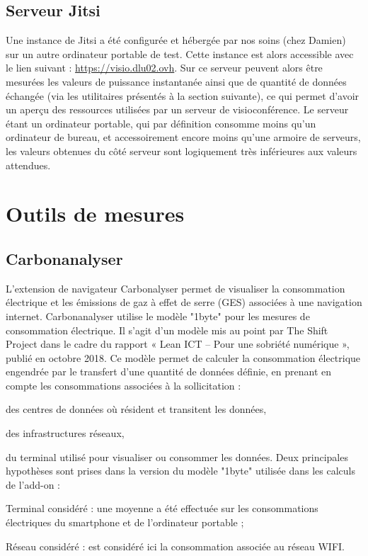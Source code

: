 \documentclass[11pt,a4paper]{report}
\begin{document}
\subsection{Serveur Jitsi}
Une instance de Jitsi a été configurée et hébergée par nos soins (chez Damien) sur un autre ordinateur portable de test. Cette instance est alors accessible avec le lien suivant : \url{https://visio.dlu02.ovh}. Sur ce serveur peuvent alors être mesurées les valeurs de puissance instantanée ainsi que de quantité de données échangée (via les utilitaires présentés à la section suivante), ce qui permet d'avoir un aperçu des ressources utilisées par un serveur de visioconférence. 
\br Le serveur étant un ordinateur portable, qui par définition consomme moins qu'un ordinateur de bureau, et accessoirement encore moins qu'une armoire de serveurs, les valeurs obtenues du côté serveur sont logiquement très inférieures aux valeurs attendues. \eb


\section{Outils de mesures}


\subsection{Carbonanalyser}
L'extension de navigateur Carbonalyser permet de visualiser la consommation électrique et les émissions de gaz à effet de serre (GES) associées à une navigation internet.
Carbonanalyser utilise le modèle "1byte" pour les mesures de consommation électrique. Il s'agit d'un modèle mis au point par The Shift Project dans le cadre du rapport « Lean ICT – Pour une sobriété numérique », publié en octobre 2018. Ce modèle permet de calculer la consommation électrique engendrée par le transfert d'une quantité de données définie, en prenant en compte les consommations associées à la sollicitation :
\bi \item des centres de données où résident et transitent les données,
\item des infrastructures réseaux,
\item du terminal utilisé pour visualiser ou consommer les données. \ei
Deux principales hypothèses sont prises dans la version du modèle "1byte" utilisée dans les calculs de l'add-on :
\bi \item Terminal considéré : une moyenne a été effectuée sur les consommations électriques du smartphone et de l'ordinateur portable ;
\item Réseau considéré : est considéré ici la consommation associée au réseau WIFI.  \ei
\end{document}
